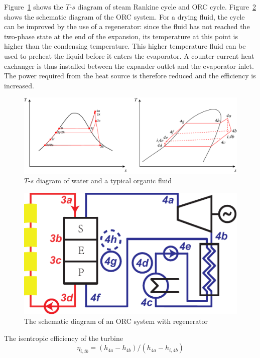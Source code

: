 Figure~\ref{fig:$T$-$s$_2systems} shows the $T$-$s$ diagram of steam Rankine cycle and ORC cycle. Figure~\ref{fig:ORCsystem2} shows the schematic diagram of the ORC system. For a drying fluid, the cycle can be improved by the use of a regenerator: since the fluid has not reached the two-phase state at the end of the expansion, its temperature at this point is higher than the condensing temperature. This higher temperature fluid can be used to preheat the liquid before it enters the evaporator.
A counter-current heat exchanger is thus installed between the expander outlet and the evaporator inlet. The power required from the heat source is therefore reduced and the efficiency is increased.

  \noindent \begin{figure}[htbp]
\begin{center}
	\includegraphics[width = 0.8\columnwidth]{fig/Ts.pdf}
	\caption{$T$-$s$ diagram of water and a typical organic fluid}
	\label{fig:$T$-$s$_2systems}
\end{center}
\end{figure}

\noindent \begin{figure}[htbp]
\begin{center}
	\includegraphics[width = 0.6\columnwidth]{fig/ORCsystem2.pdf}
	\caption{The schematic diagram of an ORC system with regenerator}
	\label{fig:ORCsystem2}
\end{center}
\end{figure}

The isentropic efficiency of the turbine
\begin{equation}
  \eta_{i,tb} = (h_{4a}-h_{4b})/(h_{4a}-h_{i,4b})
\end{equation}

